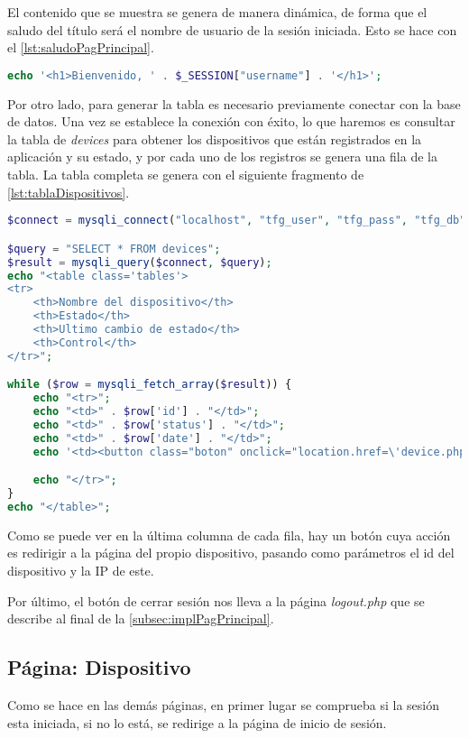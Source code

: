 El contenido que se muestra se genera de manera dinámica, de forma que el saludo del título será el nombre de usuario de la sesión iniciada. Esto se hace con el \autoref{lst:saludoPagPrincipal}.
\pagebreak

\begin{lstlisting}[language=PHP, caption=Saludo página principal, label=lst:saludoPagPrincipal]
echo '<h1>Bienvenido, ' . $_SESSION["username"] . '</h1>';
\end{lstlisting}

Por otro lado, para generar la tabla es necesario previamente conectar con la base de datos. Una vez se establece la conexión con éxito, lo que haremos es consultar la tabla de \textit{devices} para obtener los dispositivos que están registrados en la aplicación y su estado, y por cada uno de los registros se genera una fila de la tabla. La tabla completa se genera con el siguiente fragmento de \autoref{lst:tablaDispositivos}.
\begin{lstlisting}[language=PHP, caption=Visualización de tabla de dispositivos, label=lst:tablaDispositivos]
$connect = mysqli_connect("localhost", "tfg_user", "tfg_pass", "tfg_db");

$query = "SELECT * FROM devices";
$result = mysqli_query($connect, $query);
echo "<table class='tables'>
<tr>
    <th>Nombre del dispositivo</th>
    <th>Estado</th>
    <th>Ultimo cambio de estado</th>
    <th>Control</th>
</tr>";

while ($row = mysqli_fetch_array($result)) {
    echo "<tr>";
    echo "<td>" . $row['id'] . "</td>";
    echo "<td>" . $row['status'] . "</td>";
    echo "<td>" . $row['date'] . "</td>";
    echo '<td><button class="boton" onclick="location.href=\'device.php?id=' . $row['id'] . '&ip=' . $row['ip'] . '\'">Acceder</button></td>';

    echo "</tr>";
}
echo "</table>";
\end{lstlisting}

Como se puede ver en la última columna de cada fila, hay un botón cuya acción es redirigir a la página del propio dispositivo, pasando como parámetros el id del dispositivo y la IP de este.

Por último, el botón de cerrar sesión nos lleva a la página \textit{logout.php} que se describe al final de la \autoref{subsec:implPagPrincipal}.

\subsection{Página: Dispositivo}\label{subsec:página-dispositivo}
Como se hace en las demás páginas, en primer lugar se comprueba si la sesión esta iniciada, si no lo está, se redirige a la página de inicio de sesión. 

